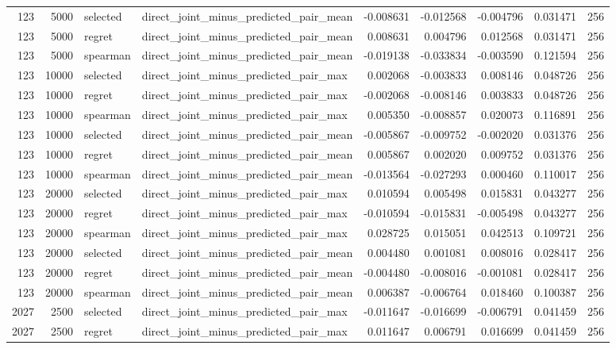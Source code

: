 \begin{tabular}{rrllrrrrr}
123 & 5000 & selected & direct_joint_minus_predicted_pair_mean & -0.008631 & -0.012568 & -0.004796 & 0.031471 & 256 \\
123 & 5000 & regret & direct_joint_minus_predicted_pair_mean & 0.008631 & 0.004796 & 0.012568 & 0.031471 & 256 \\
123 & 5000 & spearman & direct_joint_minus_predicted_pair_mean & -0.019138 & -0.033834 & -0.003590 & 0.121594 & 256 \\
123 & 10000 & selected & direct_joint_minus_predicted_pair_max & 0.002068 & -0.003833 & 0.008146 & 0.048726 & 256 \\
123 & 10000 & regret & direct_joint_minus_predicted_pair_max & -0.002068 & -0.008146 & 0.003833 & 0.048726 & 256 \\
123 & 10000 & spearman & direct_joint_minus_predicted_pair_max & 0.005350 & -0.008857 & 0.020073 & 0.116891 & 256 \\
123 & 10000 & selected & direct_joint_minus_predicted_pair_mean & -0.005867 & -0.009752 & -0.002020 & 0.031376 & 256 \\
123 & 10000 & regret & direct_joint_minus_predicted_pair_mean & 0.005867 & 0.002020 & 0.009752 & 0.031376 & 256 \\
123 & 10000 & spearman & direct_joint_minus_predicted_pair_mean & -0.013564 & -0.027293 & 0.000460 & 0.110017 & 256 \\
123 & 20000 & selected & direct_joint_minus_predicted_pair_max & 0.010594 & 0.005498 & 0.015831 & 0.043277 & 256 \\
123 & 20000 & regret & direct_joint_minus_predicted_pair_max & -0.010594 & -0.015831 & -0.005498 & 0.043277 & 256 \\
123 & 20000 & spearman & direct_joint_minus_predicted_pair_max & 0.028725 & 0.015051 & 0.042513 & 0.109721 & 256 \\
123 & 20000 & selected & direct_joint_minus_predicted_pair_mean & 0.004480 & 0.001081 & 0.008016 & 0.028417 & 256 \\
123 & 20000 & regret & direct_joint_minus_predicted_pair_mean & -0.004480 & -0.008016 & -0.001081 & 0.028417 & 256 \\
123 & 20000 & spearman & direct_joint_minus_predicted_pair_mean & 0.006387 & -0.006764 & 0.018460 & 0.100387 & 256 \\
2027 & 2500 & selected & direct_joint_minus_predicted_pair_max & -0.011647 & -0.016699 & -0.006791 & 0.041459 & 256 \\
2027 & 2500 & regret & direct_joint_minus_predicted_pair_max & 0.011647 & 0.006791 & 0.016699 & 0.041459 & 256 \\

\end{tabular}
